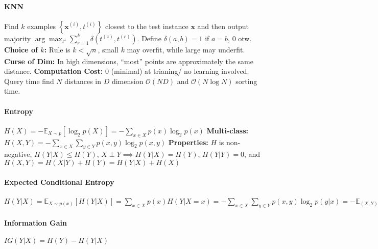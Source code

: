 \documentclass[10pt]{article}
\newcommand{\bx}{\mathbf{x}}
\begin{document}

\paragraph{KNN} Find $k$ examples $\left\{ \bx^{(i)}, t^{(i)} \right\}$ closest to the test instance $\bx$ and then output majority $\arg \max_{t^{z}} \sum_{r = 1}^k \delta (t^{(z)}, t^{(r)})$. Define $\delta (a, b) = 1$ if $a = b$, $0$ otw. \textbf{Choice of $k$:} Rule is $k < \sqrt{n}$, small $k$ may overfit, while large may underfit. \textbf{Curse of Dim:} In high dimensions, ``most'' points are approximately the same distance. \textbf{Computation Cost:} 0 (minimal) at trianing/ no learning involved. Query time find $N$ distances in $D$ dimension $\mathcal{O}(ND)$ and $\mathcal{O}(N \log N)$ sorting time.
\paragraph{Entropy} $H(X)=-\mathbb{E}_{X \sim p}\left[\log _{2} p(X)\right]=-\sum_{x \in X} p(x) \log _{2} p(x)$ \textbf{ Multi-class: } $H(X, Y)=-\sum_{x \in X} \sum_{y \in Y} p(x, y) \log _{2} p(x, y)$ \textbf{ Properties: } $H$ is non-negative, $H(Y|X) \leq H(Y)$, $X\perp Y \implies H(Y|X) = H(Y)$, $H(Y|Y) = 0$, and $H(X,Y) = H(X|Y) + H(Y) = H(Y|X) + H(X)$
\paragraph{Expected Conditional Entropy} $ H(Y | X) =\mathbb{E}_{X \sim p(x)}[H(Y | X)] =\sum_{x \in X} p(x) H(Y | X=x) =-\sum_{x \in X} \sum_{y \in Y} p(x, y) \log _{2} p(y | x) =-\mathbb{E}_{(X, Y) \sim p(x, y)}\left[\log _{2} p(Y | X)\right]$
\paragraph{Information Gain} $IG(Y | X)=H(Y)-H(Y | X)$ 
\end{document}
